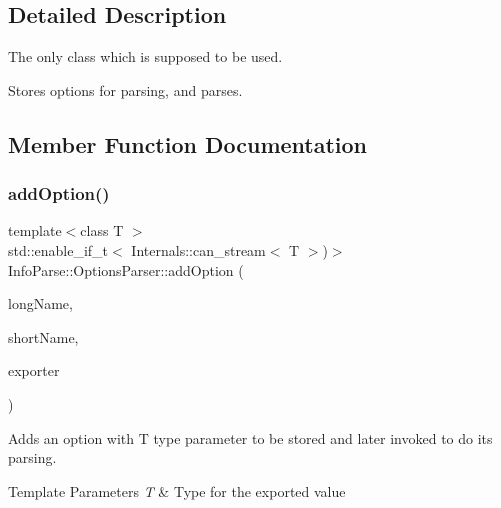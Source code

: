 \subsection{Detailed Description}
The only class which is supposed to be used.

Stores options for parsing, and parses.

\subsection{Member Function Documentation}
\mbox{\label{class_info_parse_1_1_options_parser_a1f2d084e8086dfbfac406d24045dadff}}
\subsubsection{\texorpdfstring{addOption()}{addOption()}\hspace{0.1cm}{\footnotesize\ttfamily [1/2]}}
{\footnotesize\ttfamily template$<$class T $>$ \\
std\+::enable\+\_\+if\+\_\+t$<$ Internals\+::can\+\_\+stream$<$ T $>$)$>$ Info\+Parse\+::\+Options\+Parser\+::add\+Option (\begin{DoxyParamCaption}
                                                                                                                               \item[{const std\+::string \&}]{long\+Name,  }\item[{char}]{short\+Name,  }\item[{T $\ast$}]{exporter }
\end{DoxyParamCaption})}



Adds an option with T type parameter to be stored and later invoked to do its parsing.


\begin{DoxyTemplParams}{Template Parameters}
{\em T}
    & Type for the exported value \\
    \hline
\end{DoxyTemplParams}

